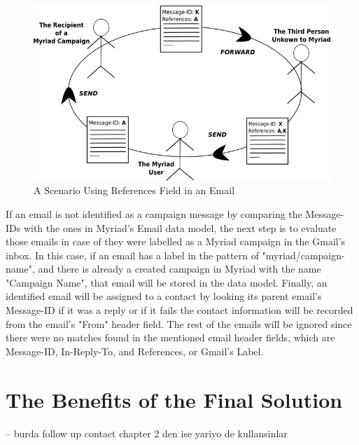 \begin{figure}[htbp]
	\centering
	\includegraphics[width=1.00\textwidth]{imgs/drawingMessageReferences.png}
	\caption[A Scenario Using References Field in an Email]{A Scenario Using References Field in an Email}
	\label{fig:drawingMessageReferences}
\end{figure}

If an email is not identified as a campaign message by comparing the Message-IDs with the ones in Myriad's Email data model, the next step is to evaluate those emails in case of they were labelled as a Myriad campaign in the Gmail's inbox. In this case, if an email has a label in the pattern of "myriad/campaign-name", and there is already a created campaign in Myriad with the name "Campaign Name", that email will be stored in the data model. Finally, an identified email will be assigned to a contact by looking its parent email's Message-ID if it was a reply or if it fails the contact information will be recorded from the email's "From" header field. The rest of the emails will be ignored since there were no matches found in the mentioned email header fields, which are Message-ID, In-Reply-To, and References, or Gmail's Label.

\section{The Benefits of the Final Solution}
\label{sec:5.4:BeneFinaSolu}

-- burda follow up contact chapter 2 den ise yariyo de kullansinlar

